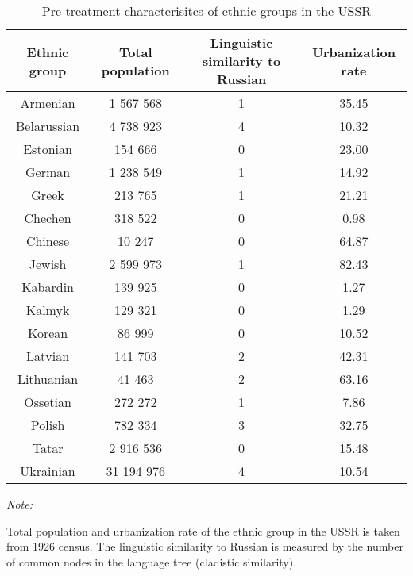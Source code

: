 \begin{table}[t]

\caption{\label{tab:}Pre-treatment characterisitcs of ethnic groups in the USSR}
\centering
\begin{threeparttable}
\begin{tabular}{cccc}
\toprule
Ethnic group & Total population & Linguistic similarity to Russian & Urbanization rate\\
\midrule
Armenian & 1 567 568 & 1 & 35.45\\
Belarussian & 4 738 923 & 4 & 10.32\\
Estonian & 154 666 & 0 & 23.00\\
German & 1 238 549 & 1 & 14.92\\
Greek & 213 765 & 1 & 21.21\\
Chechen & 318 522 & 0 & 0.98\\
Chinese & 10 247 & 0 & 64.87\\
Jewish & 2 599 973 & 1 & 82.43\\
Kabardin & 139 925 & 0 & 1.27\\
Kalmyk & 129 321 & 0 & 1.29\\
Korean & 86 999 & 0 & 10.52\\
Latvian & 141 703 & 2 & 42.31\\
Lithuanian & 41 463 & 2 & 63.16\\
Ossetian & 272 272 & 1 & 7.86\\
Polish & 782 334 & 3 & 32.75\\
Tatar & 2 916 536 & 0 & 15.48\\
Ukrainian & 31 194 976 & 4 & 10.54\\
\bottomrule
\end{tabular}
\begin{tablenotes}
\item \textit{Note: } 
\item {Total population and urbanization rate of the ethnic group in the USSR is taken from 1926 census.    The linguistic similarity to Russian is measured by the number of common nodes in the language tree (cladistic similarity).}
\end{tablenotes}
\end{threeparttable}
\end{table}